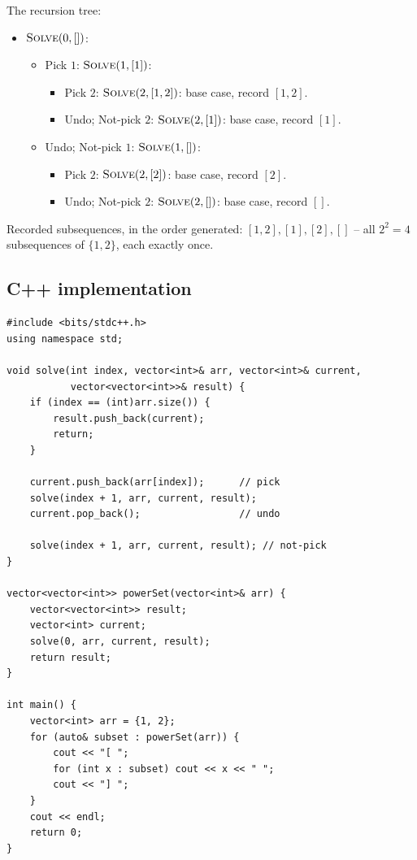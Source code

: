 
The recursion tree:
\begin{itemize}
  \item $\textsc{Solve}(0, [])$:
  \begin{itemize}
    \item Pick $1$: $\textsc{Solve}(1, [1])$:
    \begin{itemize}
      \item Pick $2$: $\textsc{Solve}(2, [1,2])$: base case, record
            $[1,2]$.
      \item Undo; Not-pick $2$: $\textsc{Solve}(2, [1])$: base case,
            record $[1]$.
    \end{itemize}
    \item Undo; Not-pick $1$: $\textsc{Solve}(1, [])$:
    \begin{itemize}
      \item Pick $2$: $\textsc{Solve}(2, [2])$: base case, record
            $[2]$.
      \item Undo; Not-pick $2$: $\textsc{Solve}(2, [])$: base case,
            record $[]$.
    \end{itemize}
  \end{itemize}
\end{itemize}

Recorded subsequences, in the order generated: $[1,2], [1], [2], []$ --
all $2^2=4$ subsequences of $\{1,2\}$, each exactly once.

\subsection*{C++ implementation}

\begin{lstlisting}
#include <bits/stdc++.h>
using namespace std;

void solve(int index, vector<int>& arr, vector<int>& current,
           vector<vector<int>>& result) {
    if (index == (int)arr.size()) {
        result.push_back(current);
        return;
    }

    current.push_back(arr[index]);      // pick
    solve(index + 1, arr, current, result);
    current.pop_back();                 // undo

    solve(index + 1, arr, current, result); // not-pick
}

vector<vector<int>> powerSet(vector<int>& arr) {
    vector<vector<int>> result;
    vector<int> current;
    solve(0, arr, current, result);
    return result;
}

int main() {
    vector<int> arr = {1, 2};
    for (auto& subset : powerSet(arr)) {
        cout << "[ ";
        for (int x : subset) cout << x << " ";
        cout << "] ";
    }
    cout << endl;
    return 0;
}
\end{lstlisting}

